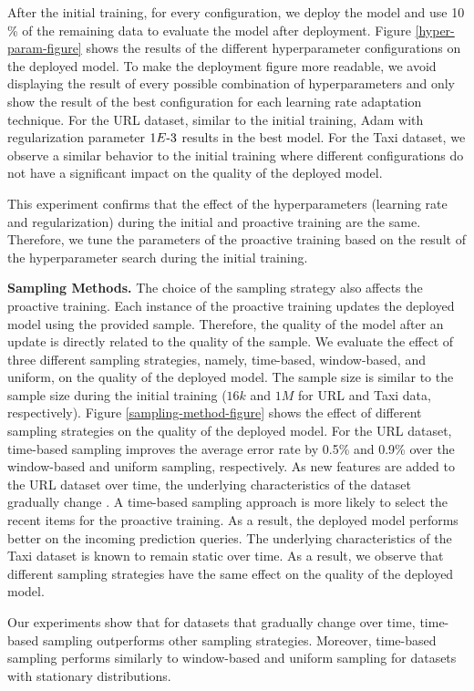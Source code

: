 After the initial training, for every configuration, we deploy the model and use 10 \% of the remaining data to evaluate the model after deployment.
Figure \ref{hyper-param-figure} shows the results of the different hyperparameter configurations on the deployed model.
To make the deployment figure more readable, we avoid displaying the result of every possible combination of hyperparameters and only show the result of the best configuration for each learning rate adaptation technique.
For the URL dataset, similar to the initial training, Adam with regularization parameter $1E{\text -}3$ results in the best model.
For the Taxi dataset, we observe a similar behavior to the initial training where different configurations do not have a significant impact on the quality of the deployed model.

This experiment confirms that the effect of the hyperparameters (learning rate and regularization) during the initial and proactive training are the same.
Therefore, we tune the parameters of the proactive training based on the result of the hyperparameter search during the initial training.

\textbf{Sampling Methods.}
The choice of the sampling strategy also affects the proactive training.
Each instance of the proactive training updates the deployed model using the provided sample.
Therefore, the quality of the model after an update is directly related to the quality of the sample.
We evaluate the effect of three different sampling strategies, namely, time-based, window-based, and uniform, on the quality of the deployed model.
The sample size is similar to the sample size during the initial training ($16k$ and $1M$ for URL and Taxi data, respectively).
Figure \ref{sampling-method-figure} shows the effect of different sampling strategies on the quality of the deployed model.
For the URL dataset, time-based sampling improves the average error rate by 0.5\% and 0.9\% over the window-based and uniform sampling, respectively.
As new features are added to the URL dataset over time, the underlying characteristics of the dataset gradually change \cite{ma2009identifying}.
A time-based sampling approach is more likely to select the recent items for the proactive training.
As a result, the deployed model performs better on the incoming prediction queries.
The underlying characteristics of the Taxi dataset is known to remain static over time.
As a result, we observe that different sampling strategies have the same effect on the quality of the deployed model.

Our experiments show that for datasets that gradually change over time, time-based sampling outperforms other sampling strategies.
Moreover, time-based sampling performs similarly to window-based and uniform sampling for datasets with stationary distributions.

